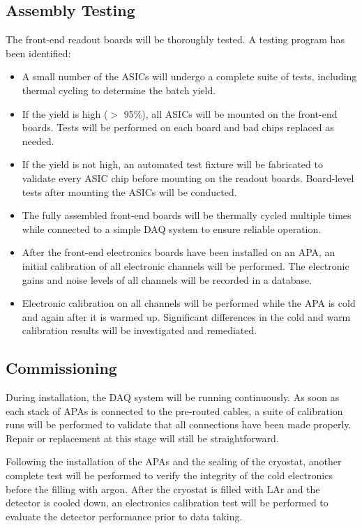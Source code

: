 \subsection{Assembly Testing}
\label{sec:ce_install_assembly}

The front-end readout boards will be thoroughly tested. A testing program has been identified:
\begin{itemize}
\item A small number of the ASICs will undergo a complete suite 
of tests, including thermal cycling to determine the batch yield.
\item If the yield is high ($>$ 95\%), all ASICs will be mounted 
on the front-end boards.
Tests will be performed on each board and bad chips replaced as needed.
\item If the yield is not high, an automated test fixture will be 
fabricated to validate every ASIC chip before mounting on the readout boards.
Board-level tests after mounting the ASICs will be conducted.
\item The fully assembled front-end boards will be thermally cycled multiple times while connected
to a simple DAQ system to ensure reliable operation.
\item After the front-end electronics boards have been installed on an APA,
an initial calibration of all electronic channels will be performed.
The electronic gains and noise levels of all channels will be recorded in a database.
\item Electronic calibration on all channels will be performed while the APA is cold and again after it is warmed up.
Significant differences in the cold and warm calibration results will be investigated and remediated.  
\end{itemize}

%
\subsection{Commissioning } 
\label{sec:ce_install_commission}

During installation, the DAQ system will be running continuously.
As soon as each stack of APAs is connected to the pre-routed cables, 
a suite of calibration runs will be performed to validate that all connections have been made properly.
Repair or replacement at this stage will still be straightforward.

Following the installation of the APAs and the sealing of the cryostat,
another complete test will be performed to verify the integrity of the cold electronics before the filling with argon.
After the cryostat is filled with LAr and the detector is cooled down,
an electronics calibration test will be performed to evaluate
the detector performance prior to data taking.

%

